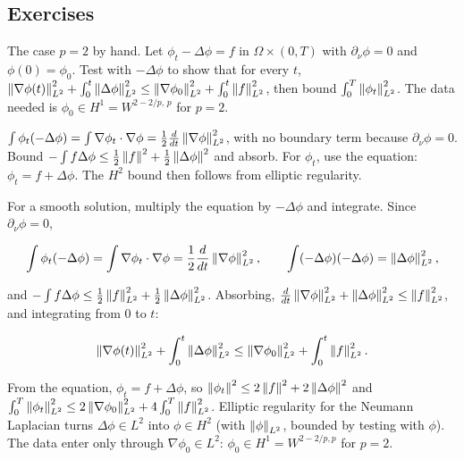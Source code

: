 \subsection*{Exercises}

\begin{exercise}
  The case $p = 2$ by hand. Let $\phi_t - \Delta\phi = f$ in $\Omega\times(0,T)$ with $\partial_\nu\phi = 0$ and $\phi(0) = \phi_0$. Test with $-\Delta\phi$ to show that for every $t$, $\left\lVert \nabla\phi(t)\right\rVert_{L^2}^2 + \int_0^t\left\lVert \Delta\phi\right\rVert_{L^2}^2 \le \left\lVert \nabla\phi_0\right\rVert_{L^2}^2 + \int_0^t\left\lVert f\right\rVert_{L^2}^2$, then bound $\int_0^T\left\lVert \phi_t\right\rVert_{L^2}^2$. The data needed is $\phi_0 \in H^1 = W^{2-2/p,\,p}$ for $p = 2$.
  \begin{hint}
    $\int\phi_t(-\Delta\phi) = \int\nabla\phi_t\cdot\nabla\phi = \frac12\frac{d}{dt}\left\lVert \nabla\phi\right\rVert_{L^2}^2$, with no boundary term because $\partial_\nu\phi = 0$. Bound $-\int f\Delta\phi \le \frac12\left\lVert f\right\rVert^2 + \frac12\left\lVert \Delta\phi\right\rVert^2$ and absorb. For $\phi_t$, use the equation: $\phi_t = f + \Delta\phi$. The $H^2$ bound then follows from elliptic regularity.
  \end{hint}
  \begin{solution}
    For a smooth solution, multiply the equation by $-\Delta\phi$ and integrate. Since $\partial_\nu\phi = 0$,

    \[ \int\phi_t(-\Delta\phi) = \int\nabla\phi_t\cdot\nabla\phi = \frac12\frac{d}{dt}\left\lVert \nabla\phi\right\rVert_{L^2}^2, \qquad
             \int(-\Delta\phi)(-\Delta\phi) = \left\lVert \Delta\phi\right\rVert_{L^2}^2, \]

    and $-\int f\Delta\phi \le \frac12\left\lVert f\right\rVert_{L^2}^2 + \frac12\left\lVert \Delta\phi\right\rVert_{L^2}^2$. Absorbing, $\frac{d}{dt}\left\lVert \nabla\phi\right\rVert_{L^2}^2 + \left\lVert \Delta\phi\right\rVert_{L^2}^2 \le \left\lVert f\right\rVert_{L^2}^2$, and integrating from $0$ to $t$:

    \[ \left\lVert \nabla\phi(t)\right\rVert_{L^2}^2 + \int_0^t\left\lVert \Delta\phi\right\rVert_{L^2}^2 \le \left\lVert \nabla\phi_0\right\rVert_{L^2}^2 + \int_0^t\left\lVert f\right\rVert_{L^2}^2. \]

    From the equation, $\phi_t = f + \Delta\phi$, so $\left\lVert \phi_t\right\rVert^2 \le 2\left\lVert f\right\rVert^2 + 2\left\lVert \Delta\phi\right\rVert^2$ and $\int_0^T\left\lVert \phi_t\right\rVert_{L^2}^2 \le 2\left\lVert \nabla\phi_0\right\rVert_{L^2}^2 + 4\int_0^T\left\lVert f\right\rVert_{L^2}^2$. Elliptic regularity for the Neumann Laplacian turns $\Delta\phi \in L^2$ into $\phi \in H^2$ (with $\left\lVert \phi\right\rVert_{L^2}$, bounded by testing with $\phi$). The data enter only through $\nabla\phi_0 \in L^2$: $\phi_0 \in H^1 = W^{2-2/p,p}$ for $p = 2$.
  \end{solution}
\end{exercise}

